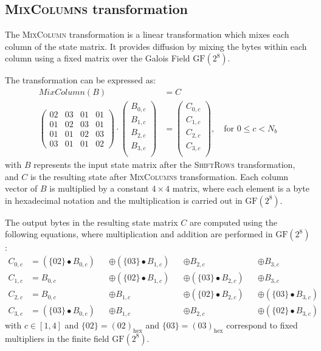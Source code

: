 \subsection{\textsc{MixColumns} transformation}
\label{sec:MixColumns}

The \textsc{MixColumn} transformation is a linear transformation which mixes each column of the state matrix. 
It provides diffusion by mixing the bytes within each column using a fixed matrix over the Galois Field $\text{GF}(2^8)$.

The transformation can be expressed as:
\begin{align}
    MixColumn(B) &= C\\
    \begin{pmatrix}
        02 & 03 & 01 & 01\\
        01 & 02 & 03 & 01\\
        01 & 01 & 02 & 03\\
        03 & 01 & 01 & 02
    \end{pmatrix}
    \cdot
    \begin{pmatrix}
        B_{0,c} \\
        B_{1,c} \\
        B_{2,c} \\
        B_{3,c} \\
    \end{pmatrix}
    &=
    \begin{pmatrix}
        C_{0,c} \\
        C_{1,c} \\
        C_{2,c} \\
        C_{3,c} \\
    \end{pmatrix}, \quad \text{for } 0 \leq c < N_b
\end{align}
with $B$ represents the input state matrix after the \textsc{ShiftRows} transformation, and $C$ is the resulting state after \textsc{MixColumns} transformation. 
Each column vector of $B$ is multiplied by a constant $4 \times 4$ matrix, where each element is a byte in hexadecimal notation and the multiplication is carried out in $\text{GF}(2^8)$.

The output bytes  in the resulting state matrix $C$ are computed using the following equations, where multiplication and addition are performed in $\text{GF}(2^8)$:
\begin{align}
    C_{0,c} & = (\{02\} \bullet B_{0,c}) &&\oplus (\{03\} \bullet B_{1,c}) &&\oplus B_{2,c} &&\oplus B_{3,c}\\
    C_{1,c} & = B_{0,c} &&\oplus (\{02\} \bullet B_{1,c}) &&\oplus (\{03\} \bullet B_{2,c}) &&\oplus B_{3,c}\\
    C_{2,c} & = B_{0,c}  &&\oplus B_{1,c} &&\oplus (\{02\} \bullet B_{2,c}) &&\oplus (\{03\} \bullet B_{3,c})\\
    C_{3,c} & = (\{03\} \bullet B_{0,c}) &&\oplus B_{1,c} &&\oplus B_{2,c} &&\oplus (\{02\} \bullet B_{3,c})
\end{align}
with $c \in [1,4]$ and $\{02\} = (02)_{\text{hex}}$ and $\{03\} = (03)_{\text{hex}}$ correspond to fixed multipliers in the finite field $\text{GF}(2^8)$.